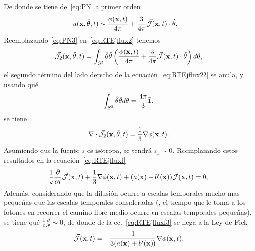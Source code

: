De donde se tiene de~\eqref{eq:PN} a primer orden
\begin{equation}
\begin{split}
\begin{aligned}
u(\mathbf{x},\hat{\theta},t)&\sim \frac{\phi(\mathbf{x},t)}{4\pi}+\frac{3}{4\pi} \vec{ \mathcal{J}}(\mathbf{x},t) \cdot \hat{\theta}.
\end{aligned}
\end{split}
\label{eq:PN3}
\end{equation}
Reemplazando~\eqref{eq:PN3} en~\eqref{eq:RTEjflux2} tenemos
\begin{equation}
\vec{ \mathcal{J}}_2(\mathbf{x},\hat{\theta},t)=\int_{S^2} \hat{\theta} \hat{\theta} \left(  \frac{\phi(\mathbf{x},t)}{4\pi}+\frac{3}{4\pi} \vec{ \mathcal{J}}(\mathbf{x},t) \cdot \hat{\theta} \right) d\theta,
\label{eq:RTEjflux22}
\end{equation}
el segundo término del lado derecho de la ecuación~\eqref{eq:RTEjflux22} se anula, y usando qué~\cite[p. 544, cap. 17]{Modest2013}
\begin{equation}
\int_{S^2} \hat{\theta} \hat{\theta} d\theta=\frac{4\pi}{3} \bar{\mathbf{1}},
\label{eq:RTEjflux22}
\end{equation}
se tiene 
\begin{equation}
\nabla \cdot \vec{ \mathcal{J}}_2(\mathbf{x},\hat{\theta},t)=\frac{1}{3}\nabla \phi(\mathbf{x},t).
\label{eq:RTEjflux23}
\end{equation}
Asumiendo que la fuente $s$ es isótropa, se tendrá $s_1\sim 0$. Reemplazando estos 
resultados en la ecuación~\eqref{eq:RTEjfluxf}
\begin{equation}
\begin{split}
\begin{aligned}
\frac{1}{c}\frac{\partial}{\partial t} \vec{ \mathcal{J}}(\mathbf{x},t)+\frac{1}{3}\nabla  \phi(\mathbf{x},t) +(a(\mathbf{x})+b'(\mathbf{x}))\vec{ \mathcal{J}}(\mathbf{x},t)=0,
\end{aligned}
\end{split}
\label{eq:RTEjfluxf3}
\end{equation}
Además, considerando que la difusión ocurre a escalas 
temporales mucho mas pequeñas que las escalas temporales 
consideradas (\ie, el tiempo que le toma a los fotones en recorrer 
el camino libre medio ocurre en escalas temporales pequeñas), se 
tiene qué $\frac{1}{c}\frac{\partial}{\partial t}\sim 0$, de donde de 
la ec.~\eqref{eq:RTEjfluxf3} se llega a la Ley de Fick
\begin{equation}
\begin{split}
\begin{aligned}
\vec{ \mathcal{J}}(\mathbf{x},t)=-\frac{1}{3(a(\mathbf{x})+b'(\mathbf{x}))} \nabla  \phi(\mathbf{x},t) ,
\end{aligned}
\end{split}
\label{eq:Fick}
\end{equation}
